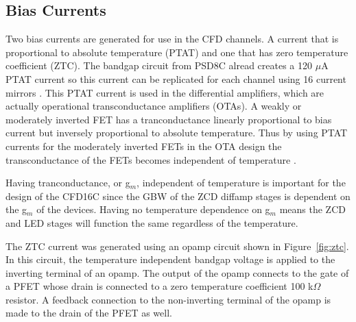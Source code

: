 \documentclass[12pt,oneside,final]{siuethesis}
\theoremstyle{definition}
\begin{document}
\subsection{Bias Currents}
\par Two bias currents are generated for use in the CFD channels. A current that is proportional to absolute temperature (PTAT) and one that has zero temperature coefficient (ZTC). The bandgap circuit from PSD8C alread creates a 120 $\mu$A PTAT current so this current can be replicated for each channel using 16 current mirrors \cite{PROCTOR}. This PTAT current is used in the differential amplifiers, which are actually operational transconductance amplifiers (OTAs). A weakly or moderately inverted FET has a tranconductance linearly proportional to bias current but inversely proportional to absolute temperature. Thus by using PTAT currents for the moderately inverted FETs in the OTA design the transconductance of the FETs becomes independent of temperature \cite{TRANS}.
\par Having tranconductance, or g$_{m}$, independent of temperature is important for the design of the CFD16C since the GBW of the ZCD diffamp stages is dependent on the g$_{m}$ of the devices. Having no temperature dependence on g$_{m}$ means the ZCD and LED stages will function the same regardless of the temperature. 
\par The ZTC current was generated using an opamp circuit shown in Figure~\ref{fig:ztc}. In this circuit, the temperature independent bandgap voltage is applied to the inverting terminal of an opamp. The output of the opamp connects to the gate of a PFET whose drain is connected to a zero temperature coefficient 100 k$\Omega$ resistor. A feedback connection to the non-inverting terminal of the opamp is made to the drain of the PFET as well. 
\end{document}
